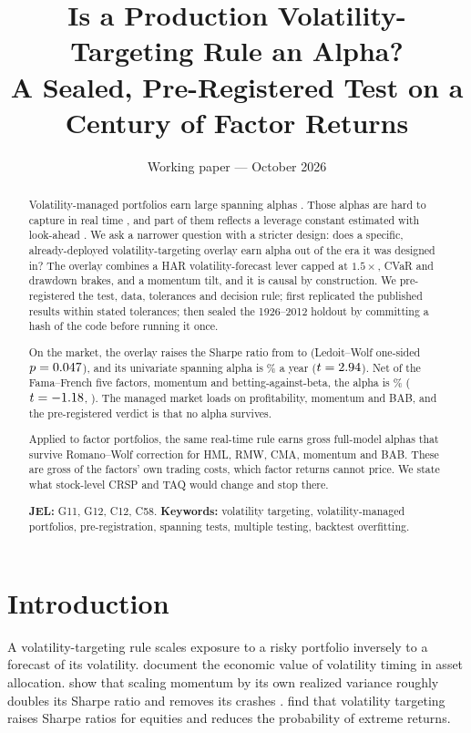 \documentclass[11pt]{article}
\title{Is a Production Volatility-Targeting Rule an Alpha?\\
A Sealed, Pre-Registered Test on a Century of Factor Returns}
\author{}
\date{Working paper --- October 2026}
\begin{document}
\maketitle

\begin{abstract}
\noindent
Volatility-managed portfolios earn large spanning alphas
\citep{moreira2017}. Those alphas are hard to capture in real time
\citep{cederburg2020}, and part of them reflects a leverage constant
estimated with look-ahead \citep{liu2019}. We ask a narrower question with a
stricter design: does a specific, already-deployed volatility-targeting
overlay earn alpha out of the era it was designed in? The overlay combines a
HAR volatility-forecast lever capped at $1.5\times$, CVaR and drawdown
brakes, and a momentum tilt, and it is causal by construction. We
pre-registered the test, data, tolerances and decision rule; first
replicated the published results within stated tolerances; then sealed the
1926--2012 holdout by committing a hash of the code before running it once.

On the market, the overlay raises the Sharpe ratio from \mktSRr{} to
\mktSRm{} (Ledoit--Wolf one-sided $p=0.047$), and its univariate spanning
alpha is \mktUniA\% a year ($t=2.94$). Net of the Fama--French five
factors, momentum and betting-against-beta, the alpha is \mktFullA\%
($t=-1.18$, \mktFullSpan). The managed market loads on profitability,
momentum and BAB, and the pre-registered verdict is that no alpha survives.

Applied to factor portfolios, the same real-time rule earns gross
full-model alphas that survive Romano--Wolf correction for HML, RMW, CMA,
momentum and BAB. These are gross of the factors' own trading costs, which
factor returns cannot price. We state what stock-level CRSP and TAQ would
change and stop there.

\medskip
\noindent\textbf{JEL:} G11, G12, C12, C58.\quad
\textbf{Keywords:} volatility targeting, volatility-managed portfolios,
pre-registration, spanning tests, multiple testing, backtest overfitting.
\end{abstract}

\section{Introduction}

A volatility-targeting rule scales exposure to a risky portfolio inversely to
a forecast of its volatility. \citet{fleming2001} document the economic value
of volatility timing in asset allocation. \citet{barroso2015} show that
scaling momentum by its own realized variance roughly doubles its Sharpe
ratio and removes its crashes \citep[see also][]{daniel2016}.
\citet{harvey2018} find that volatility targeting raises Sharpe ratios for
equities and reduces the probability of extreme returns.
\end{document}
